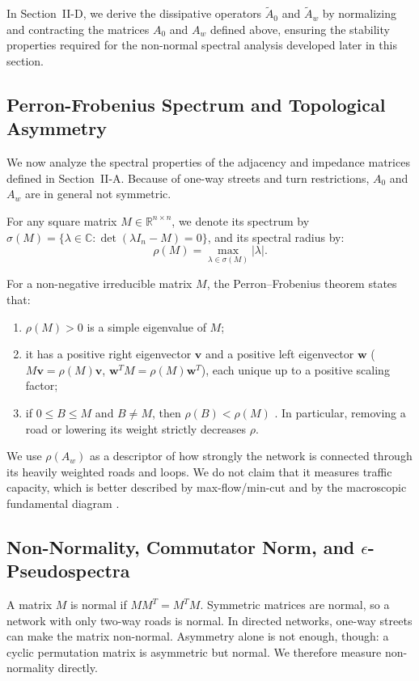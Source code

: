 \documentclass[journal]{IEEEtran}
\begin{document}
In Section~II-D, we derive the dissipative operators $\tilde{A}_0$ and $\tilde{A}_w$ by normalizing and contracting the matrices $A_0$ and $A_w$ defined above, ensuring the stability properties required for the non-normal spectral analysis developed later in this section.

\subsection{Perron-Frobenius Spectrum and Topological Asymmetry}
We now analyze the spectral properties of the adjacency and impedance matrices defined in Section~II-A. Because of one-way streets and turn restrictions, $A_0$ and $A_w$ are in general not symmetric.

For any square matrix $M \in \mathbb{R}^{n \times n}$, we denote its spectrum by $\sigma(M) = \{ \lambda \in \mathbb{C} : \det(\lambda I_n - M) = 0 \}$, and its spectral radius by:
\begin{equation}
\rho(M) = \max_{\lambda \in \sigma(M)} |\lambda|.
\label{eq:spectral_radius_def}
\end{equation}

For a non-negative irreducible matrix $M$, the Perron--Frobenius theorem \cite{Horn2013, Berman1994} states that:
\begin{enumerate}
    \item $\rho(M) > 0$ is a simple eigenvalue of $M$;
    \item it has a positive right eigenvector $\mathbf{v}$ and a positive left eigenvector $\mathbf{w}$ ($M \mathbf{v} = \rho(M) \mathbf{v}$, $\mathbf{w}^T M = \rho(M) \mathbf{w}^T$), each unique up to a positive scaling factor;
    \item if $0 \le B \le M$ and $B \neq M$, then $\rho(B) < \rho(M)$ \cite{Horn2013, Berman1994}. In particular, removing a road or lowering its weight strictly decreases $\rho$.
\end{enumerate}

We use $\rho(A_w)$ as a descriptor of how strongly the network is connected through its heavily weighted roads and loops. We do not claim that it measures traffic capacity, which is better described by max-flow/min-cut and by the macroscopic fundamental diagram \cite{Geroliminis2008, Daganzo2008}.

\subsection{Non-Normality, Commutator Norm, and $\epsilon$-Pseudospectra}
A matrix $M$ is normal if $M M^T = M^T M$. Symmetric matrices are normal, so a network with only two-way roads is normal. In directed networks, one-way streets can make the matrix non-normal. Asymmetry alone is not enough, though: a cyclic permutation matrix is asymmetric but normal. We therefore measure non-normality directly.
\end{document}

